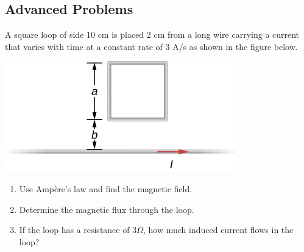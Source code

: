 \documentclass[11pt,addpoints]{exam}
\begin{document}
\begin{questions}
		\subsection*{Advanced Problems}
		\question A square loop of side 10 cm is placed 2 cm from a long wire carrying a current that varies with time at a constant rate of 3 A/s as shown in the figure below.
		\begin{center}
			\includegraphics[scale=1]{1}
		\end{center} 
		\begin{enumerate}[label=(\roman*)]
			\item Use Ampère’s law and find the magnetic field. 
			\item Determine the magnetic flux through the loop.
			\item If the loop has a resistance of 3$\Omega$, how much induced current flows in the loop? 
		\end{enumerate}
	\end{questions}		
\end{document}
